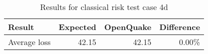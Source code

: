 \begin{table}[htbp]

\centering
\begin{tabular}{ l r r r }

\hline
\rowcolor{anti-flashwhite}
\bf{Result} & \bf{Expected} & \bf{OpenQuake} & \bf{Difference}\\
\hline
Average loss & 42.15 & 42.15 & 0.00\% \\
\hline
\end{tabular}

\caption{Results for classical risk test case 4d}
\label{tab:result-cr-4d}
\end{table}